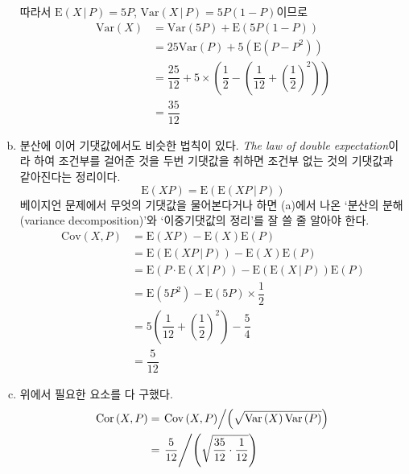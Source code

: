 \documentclass[answers]{exam}
\begin{document}
\begin{questions}
\begin{solution}
\begin{enumerate}[(a)]
\begin{equation}
    		\end{equation}
    		따라서 $\mathrm{E}\left(X\,|\,P\right)=5P$, $\mathrm{Var}\left(X\,|\,P\right)=5P\left(1-P\right)$이므로
    		\begin{align}
    			\mathrm{Var}\left(X\right) &= \mathrm{Var}\left(5P\right)+\mathrm{E}\left(5P\left(1-P\right)\right)\\
    			&=25\mathrm{Var}\left(P\right)+5\left(\mathrm{E}\left(P-P^{2}\right)\right)\\
    			&=\dfrac{25}{12}+5\times\left(\dfrac{1}{2}-\left(\dfrac{1}{12}+\left(\dfrac{1}{2}\right)^{2}\right)\right)\\
    			&= \dfrac{35}{12}
    		\end{align}
    		\item 분산에 이어 기댓값에서도 비슷한 법칙이 있다. \emph{The law of double expectation}이라 하여 조건부를 걸어준 것을 두번 기댓값을 취하면 조건부 없는 것의 기댓값과 같아진다는 정리이다.
    		\begin{equation}
    			\mathrm{E}\left(XP\right) = \mathrm{E}\left(\mathrm{E}\left(XP\,|\,P\right)\right)
    		\end{equation}
    		베이지언 문제에서 무엇의 기댓값을 물어본다거나 하면 (a)에서 나온 `분산의 분해(variance decomposition)'와 `이중기댓값의 정리'를 잘 쓸 줄 알아야 한다.
    		\begin{align}
    			\mathrm{Cov}\left(X,P\right) &= \mathrm{E}\left(XP\right) -\mathrm{E}\left(X\right)\mathrm{E}\left(P\right)\\
    			&= \mathrm{E}\left(\mathrm{E}\left(XP\,|\,P\right)\right) -\mathrm{E}\left(X\right)\mathrm{E}\left(P\right)\\
    			&= \mathrm{E}\left(P\cdot\mathrm{E}\left(X\,|\,P\right)\right) -\mathrm{E}\left(\mathrm{E}\left(X\,|\,P\right)\right)\mathrm{E}\left(P\right)\\
    			&= \mathrm{E}\left(5P^{2}\right)-\mathrm{E}\left(5P\right)\times\dfrac{1}{2}\\
    			&= 5\left(\dfrac{1}{12}+\left(\dfrac{1}{2}\right)^{2}\right)-\dfrac{5}{4}\\
    			&= \dfrac{5}{12}
    		\end{align}
    		\item 위에서 필요한 요소를 다 구했다.
    		\begin{align}
    			\mathrm{Cor}\left(X,P\right) &= \left.\mathrm{Cov}\left(X,P\right)\middle/ \left(\sqrt{\mathrm{Var}\left(X\right)\mathrm{Var}\left(P\right)}\right)\right.\\
    			&= \left.\dfrac{5}{12}\middle/\left(\sqrt{\dfrac{35}{12}\cdot\dfrac{1}{12}}\right)\right.\\

\end{align}
\end{enumerate}
\end{solution}
\end{questions}
\end{document}
